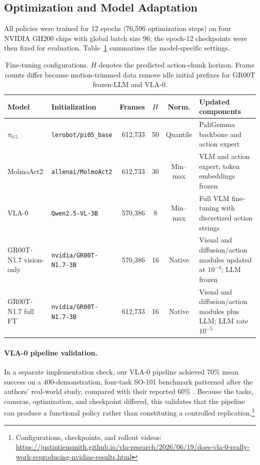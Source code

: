 \documentclass[conference]{IEEEtran}
\begin{document}
\subsection{Optimization and Model Adaptation}

All policies were trained for 12 epochs (76,596 optimization steps) on
four NVIDIA GH200 chips with global batch size 96; the epoch-12 checkpoints
were then fixed for evaluation. Table~\ref{tab:training_configuration}
summarizes the model-specific settings.

\begin{table}[t]
\centering
\scriptsize
\setlength{\tabcolsep}{3pt}
\caption{Fine-tuning configurations. $H$ denotes the predicted action-chunk
horizon. Frame counts differ because motion-trimmed data remove idle initial
prefixes for GR00T frozen-LLM and VLA-0.}
\label{tab:training_configuration}
\begin{tabular}{p{}p{}rccp{}}
\toprule
\textbf{Model} & \textbf{Initialization} & \textbf{Frames} & \textbf{$H$} &
\textbf{Norm.} & \textbf{Updated components} \\
\midrule
$\pi_{0.5}$ & \texttt{lerobot/pi05\_base} & 612,733 & 50 & Quantile &
PaliGemma backbone and action expert \\
MolmoAct2 & \texttt{allenai/MolmoAct2} & 612,733 & 30 & Min--max &
VLM and action expert; token embeddings frozen \\
VLA-0 & \texttt{Qwen2.5-VL-3B} & 570,386 & 8 & Min--max &
Full VLM fine-tuning with discretized action strings \\
GR00T-N1.7 vision-only & \texttt{nvidia/GR00T-N1.7-3B} & 570,386 & 16 &
Native & Visual and diffusion/action modules updated at $10^{-4}$; LLM frozen \\
GR00T-N1.7 full FT & \texttt{nvidia/GR00T-N1.7-3B} & 612,733 & 16 &
Native & Visual and diffusion/action modules plus LLM; LLM rate $10^{-5}$ \\
\bottomrule
\end{tabular}
\end{table}

\paragraph{VLA-0 pipeline validation.}
In a separate implementation check, our VLA-0 pipeline achieved 70\% mean
success on a 400-demonstration, four-task SO-101 benchmark patterned after
the authors' real-world study, compared with their reported 60\%
\cite{goyal2025vla0}. Because the tasks, cameras, optimization, and
checkpoint differed, this validates that the pipeline can produce a
functional policy rather than constituting a controlled replication.\footnote{Configurations, checkpoints, and rollout videos:
\url{https://justintiensmith.github.io/vla-research/2026/06/19/does-vla-0-really-work-reproducing-nvidias-results.html}}
\end{document}
